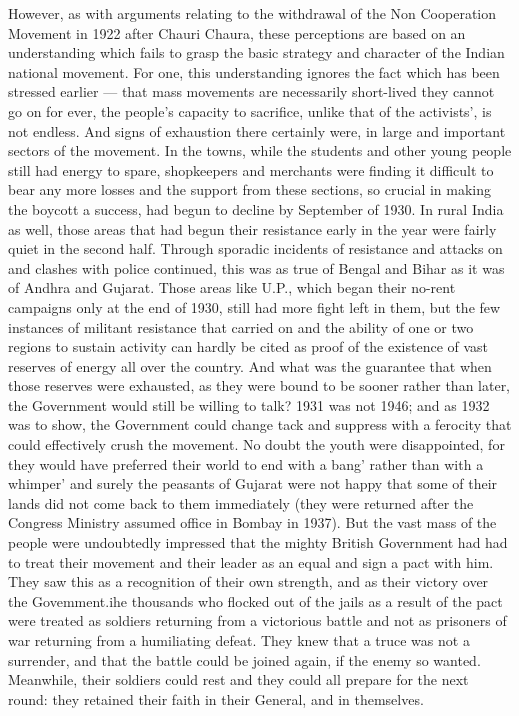 However, as with arguments relating to the withdrawal of the Non Cooperation Movement in 1922 after Chauri Chaura, these perceptions are based on an understanding which fails to grasp the basic strategy and character of the Indian national movement. For one, this understanding ignores the fact which has been stressed earlier --- that mass movements are necessarily short-lived they cannot go on for ever, the people's capacity to sacrifice, unlike that of the activists', is not endless. And signs of exhaustion there certainly were, in large and important sectors of the movement. In the towns, while the students and other young people still had energy to spare, shopkeepers and merchants were finding it difficult to bear any more losses and the support from these sections, so crucial in making the boycott a success, had begun to decline by September of 1930. In rural India as well, those areas that had begun their resistance early in the year were fairly quiet in the second half. Through sporadic incidents of resistance and attacks on and clashes with police continued, this was as true of Bengal and Bihar as it was of Andhra and Gujarat. Those areas like U.P., which began their no-rent campaigns only at the end of 1930, still had more fight left in them, but the few instances of militant resistance that carried on and the ability of one or two regions to sustain activity can hardly be cited as proof of the existence of vast reserves of energy all over the country. And what was the guarantee that when those reserves were exhausted, as they were bound to be sooner rather than later, the Government would still be willing to talk? 1931 was not 1946; and as 1932 was to show, the Government could change tack and suppress with a ferocity that could effectively crush the movement. No doubt the youth were disappointed, for they would have preferred their world to end with a bang' rather than with a whimper' and surely the peasants of Gujarat were not happy that some of their lands did not come back to them immediately (they were returned after the Congress Ministry assumed office in Bombay in 1937). But the vast mass of the people were undoubtedly impressed that the mighty British Government had had to treat their movement and their leader as an equal and sign a pact with him. They saw this as a recognition of their own strength, and as their victory over the Govemment.ihe thousands who flocked out of the jails as a result of the pact were treated as soldiers returning from a victorious battle and not as prisoners of war returning from a humiliating defeat. They knew that a truce was not a surrender, and that the battle could be joined again, if the enemy so wanted. Meanwhile, their soldiers could rest and they could all prepare for the next round: they retained their faith in their General, and in themselves.

